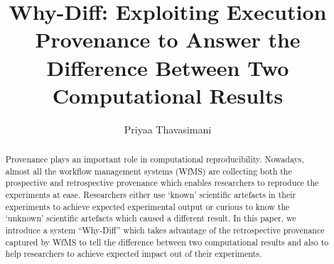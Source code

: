 \documentclass[10pt,conference,twocolumn]{IEEEtran}
\title{\LARGE{Why-Diff: Exploiting Execution Provenance to Answer the Difference Between Two Computational Results}}
\author{Priyaa Thavasimani}
\begin{document}
\maketitle
\begin{abstract}
Provenance plays an important role in computational reproducibility. Nowadays, almost all the workflow management systems (WfMS) are collecting both the prospective and retrospective provenance which enables researchers to reproduce the experiments at ease. Researchers either use `known' scientific artefacts in their experiments to achieve expected experimental output or curious to know the `unknown' scientific artefacts which caused a different result. In this paper, we introduce a system “Why-Diff” which takes advantage of the retrospective provenance captured by WfMS to tell the difference between two computational results and also to help researchers to achieve expected impact out of their experiments.
\end{abstract}
\end{document}
